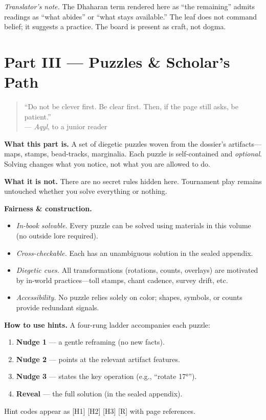 \documentclass[11pt]{article}
\begin{document}
\medskip
\noindent\textit{Translator’s note.} The Dhaharan term rendered here as “the remaining” admits readings as “what abides” or “what stays available.” The leaf does not command belief; it suggests a practice. The board is present as craft, not dogma.



\section*{Part III — Puzzles \& Scholar’s Path}
\label{part:puzzles}
{}

\begin{quote}\small
“Do not be clever first. Be clear first. Then, if the page still asks, be patient.”\\
\hfill — \textit{Aqyl}, to a junior reader
\end{quote}

\noindent\textbf{What this part is.} A set of diegetic puzzles woven from the dossier’s artifacts—maps, stamps, bead-tracks, marginalia. Each puzzle is self-contained and \emph{optional}. Solving changes what you notice, not what you are allowed to do.

\medskip
\noindent\textbf{What it is not.} There are no secret rules hidden here. Tournament play remains untouched whether you solve everything or nothing.

\medskip
\noindent\textbf{Fairness \& construction.}
\begin{itemize}\setlength\itemsep{0.3em}
  \item \emph{In-book solvable.} Every puzzle can be solved using materials in this volume (no outside lore required).
  \item \emph{Cross-checkable.} Each has an unambiguous solution in the sealed appendix.
  \item \emph{Diegetic cues.} All transformations (rotations, counts, overlays) are motivated by in-world practices—toll stamps, chant cadence, survey drift, etc.
  \item \emph{Accessibility.} No puzzle relies solely on color; shapes, symbols, or counts provide redundant signals.
\end{itemize}

\medskip
\noindent\textbf{How to use hints.} A four-rung ladder accompanies each puzzle:
\begin{enumerate}\setlength\itemsep{0.25em}
  \item \textbf{Nudge 1} — a gentle reframing (no new facts).
  \item \textbf{Nudge 2} — points at the relevant artifact features.
  \item \textbf{Nudge 3} — states the key operation (e.g., “rotate 17°”).
  \item \textbf{Reveal} — the full solution (in the sealed appendix).
\end{enumerate}
Hint codes appear as \textsc{[H1] [H2] [H3] [R]} with page references.
\end{document}
